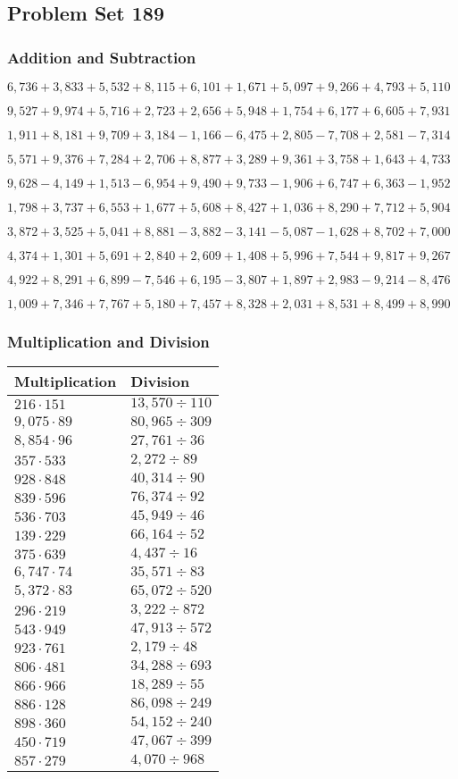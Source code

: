 \hypertarget{problem-set-189}{%
\subsection{Problem Set 189}\label{problem-set-189}}

\hypertarget{addition-and-subtraction}{%
\subsubsection{Addition and
Subtraction}\label{addition-and-subtraction}}

\(6,736+3,833+5,532+8,115+6,101+1,671+5,097+9,266+4,793+5,110\)

\(9,527+9,974+5,716+2,723+2,656+5,948+1,754+6,177+6,605+7,931\)

\(1,911+8,181+9,709+3,184-1,166-6,475+2,805-7,708+2,581-7,314\)

\(5,571+9,376+7,284+2,706+8,877+3,289+9,361+3,758+1,643+4,733\)

\(9,628-4,149+1,513-6,954+9,490+9,733-1,906+6,747+6,363-1,952\)

\(1,798+3,737+6,553+1,677+5,608+8,427+1,036+8,290+7,712+5,904\)

\(3,872+3,525+5,041+8,881-3,882-3,141-5,087-1,628+8,702+7,000\)

\(4,374+1,301+5,691+2,840+2,609+1,408+5,996+7,544+9,817+9,267\)

\(4,922+8,291+6,899-7,546+6,195-3,807+1,897+2,983-9,214-8,476\)

\(1,009+7,346+7,767+5,180+7,457+8,328+2,031+8,531+8,499+8,990\)

\hypertarget{multiplication-and-division}{%
\subsubsection{Multiplication and
Division}\label{multiplication-and-division}}

\begin{longtable}[]{@{}ll@{}}
\toprule
Multiplication & Division\tabularnewline
\midrule
\endhead
\(216\cdot151\) & \(13,570÷110\)\tabularnewline
\(9,075\cdot89\) & \(80,965÷309\)\tabularnewline
\(8,854\cdot96\) & \(27,761÷36\)\tabularnewline
\(357\cdot533\) & \(2,272÷89\)\tabularnewline
\(928\cdot848\) & \(40,314÷90\)\tabularnewline
\(839\cdot596\) & \(76,374÷92\)\tabularnewline
\(536\cdot703\) & \(45,949÷46\)\tabularnewline
\(139\cdot229\) & \(66,164÷52\)\tabularnewline
\(375\cdot639\) & \(4,437÷16\)\tabularnewline
\(6,747\cdot74\) & \(35,571÷83\)\tabularnewline
\(5,372\cdot83\) & \(65,072÷520\)\tabularnewline
\(296\cdot219\) & \(3,222÷872\)\tabularnewline
\(543\cdot949\) & \(47,913÷572\)\tabularnewline
\(923\cdot761\) & \(2,179÷48\)\tabularnewline
\(806\cdot481\) & \(34,288÷693\)\tabularnewline
\(866\cdot966\) & \(18,289÷55\)\tabularnewline
\(886\cdot128\) & \(86,098÷249\)\tabularnewline
\(898\cdot360\) & \(54,152÷240\)\tabularnewline
\(450\cdot719\) & \(47,067÷399\)\tabularnewline
\(857\cdot279\) & \(4,070÷968\)\tabularnewline
\bottomrule
\end{longtable}
